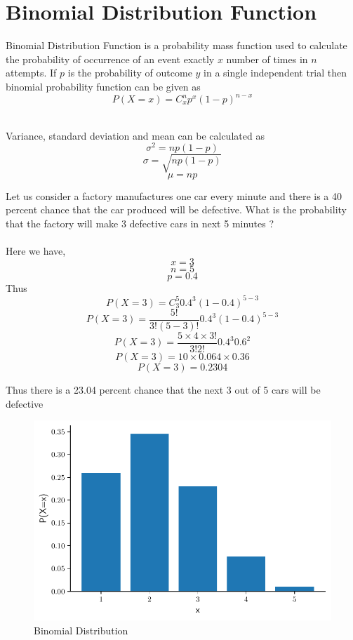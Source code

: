 \documentclass[twoside,12pt]{report}  %
\begin{document}
\section{Binomial Distribution Function}

\begin{tcolorbox}[colback=red!5!white, colframe=red!75!black, title = \textbf{Binomial Distribution Function}]
	Binomial Distribution Function is a probability mass function used to calculate the probability of occurrence of an event exactly $x$ number of times in $n$ attempts. If $p$ is the probability of outcome $y$ in a single independent trial then binomial probability function can be given as
	$$ \boxed{P(X=x) = C^{n}_{x} p^{x} (1-p)^{n-x}} $$  
\end{tcolorbox}
\noindent
\\
Variance, standard deviation and mean can be calculated as
$$ \boxed{\sigma^{2}=np(1-p)} $$
$$ \boxed{\sigma = \sqrt{np(1-p)}} $$
$$ \boxed{\mu = np} $$

\vfill
\pagebreak

\begin{tcolorbox}[colback=blue!5!white, colframe=blue!75!black, title = \textbf{Binomial Distribution Function}]
	Let us consider a factory manufactures one car every minute and there is a 40 percent chance that the car produced will be defective. What is the probability that the factory will make 3 defective cars in next 5 minutes ? 
	\\
	\\
	Here we have,
	$$ x=3 $$
	$$ n=5 $$
	$$ p=0.4 $$
	Thus 
	$$P(X=3) = C^{5}_{3} 0.4^{3}(1-0.4)^{5-3}$$
	$$ P(X=3) = \frac{5!}{3!(5-3)!} 0.4^{3}(1-0.4)^{5-3} $$
	$$ P(X=3) = \frac{5 \times 4 \times 3!}{3!2!} 0.4^{3} 0.6^{2} $$	
	$$ P(X=3) = 10 \times 0.064 \times 0.36 $$
	$$ P(X=3) = 0.2304 $$
	
	Thus there is a 23.04 percent chance that the next 3 out of 5 cars will be defective 
	
	\begin{figure}[H]
		\centering
		\includegraphics[width=0.5\linewidth]{./images/binomial_example.pdf}
		\caption{Binomial Distribution}
		\label{figure_binomial_example}
	\end{figure}

\end{tcolorbox}
\noindent
\\
\end{document}
